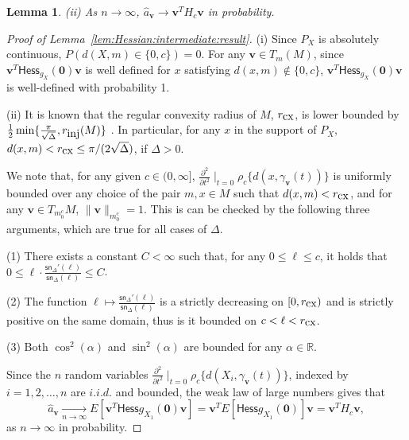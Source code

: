 \documentclass[preprint]{imsart}
\def\vv{\mathbf v}
\theoremstyle{plain}
\newtheorem{lemma}{Lemma}
\theoremstyle{remark}
\begin{document}
\begin{appendix}
\begin{lemma}
(ii) As $n\to \infty$, $\hat{a}_\vv \to  \vv^T H_c \vv
$
in probability. 
\end{lemma}
\begin{proof}[Proof of Lemma~\ref{lem:Hessian:intermediate:result}]
(i) Since $P_X$ is absolutely continuous, $P(d(X,m) \in \{0,c\}) = 0$. For any $\vv \in T_m(M)$, since $\vv^T \textsf{Hess}_{g_{X}}(\mathbf{0}) \vv$ is well defined for $x$ satisfying $d(x,m) \notin \{0,c\}$, $\vv^T \textsf{Hess}_{g_{X}}(\mathbf{0}) \vv$ is well-defined with probability 1. 

(ii) It is known that the regular convexity radius of $M$,  $r_{\mbox{\tiny cx}}$, is lower bounded by $\frac{1}{2} \min\{\frac{\pi}{\sqrt{\Delta}}, r_{\mbox{\tiny inj}}(M)\}$ \citep[cf.][]{afsari2013convergence}. In particular, for any $x$ in the support of $P_X$, $ d(x,m) < r_{\mbox{\tiny cx}} \le \pi / (2{\sqrt{\Delta}})$, if $\Delta > 0$. 

We note that, for any given $c \in (0,\infty]$, $\frac{\partial^2}{\partial t^2 } \mid_{t= 0} \rho_c\{ d(x, \gamma_{\vv}(t))\}$ is uniformly bounded over any choice of the pair $m, x \in M$ such that $d(x,m) < r_{\mbox{\tiny cx}}$, and for any $\vv \in T_{m^c_0}M$, $\|\vv\|_{m^c_0} = 1$. This is can be checked by the following three arguments, which are true for all cases of $\Delta$.  

(1) There exists a constant $C <\infty$ such that, for any $ 0 \le \ell \le c $, it holds that 
$0 \le \ell \cdot \frac{\textsf{sn}_{\Delta}'(\ell)}{\textsf{sn}_{\Delta}(\ell)} \le C$. 

(2) The function $\ell \mapsto \frac{\textsf{sn}_{\Delta}'(\ell)}{\textsf{sn}_{\Delta}(\ell)}$ is a strictly decreasing on $[0, r_{\mbox{\tiny cx}})$ and is strictly positive on the same domain, thus is it bounded on $c < \ell < r_{\mbox{\tiny cx}}$. 

(3) Both $\cos^2(\alpha)$ and $\sin^2(\alpha)$ are bounded for any $\alpha \in \mathbb{R}$. 

Since the $n$ random variables $\frac{\partial^2}{\partial t^2 } \mid_{t= 0}\rho_c\{ d(X_i, \gamma_{\vv}(t))\}$, indexed by $i =1, 2, \ldots, n$ are $\textit{i.i.d.}$ and bounded, the weak law of large numbers gives that 
$$
\hat{a}_\vv \underset{n \to \infty}{\to} E [\vv^T \textsf{Hess} g_{X_1}(\mathbf{0}) \vv] = \vv^T E [\textsf{Hess} g_{X_1}(\mathbf{0})] \vv = \vv^T H_c \vv,
$$
as $n\to \infty$ in probability.
\end{proof}


\end{appendix}
\end{document}

